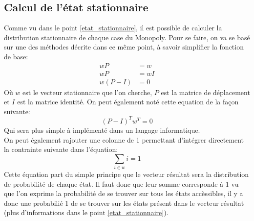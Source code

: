 \documentclass[letterpaper]{article}
\begin{document}
  \subsection{Calcul de l'état stationnaire}
    Comme vu dans le point \ref{etat_stationnaire}, il est possible de calculer
    la distribution stationnaire de chaque case du Monopoly.  Pour se faire, on va
    se basé sur une des méthodes décrite dans ce même point, à savoir simplifier la
    fonction de base:
    \begin{align*}
     wP &= w\\
     wP &= wI\\
     w(P-I) &= 0
    \end{align*}
    Où $w$ est le vecteur stationnaire que l'on cherche, $P$ est la matrice de 
    déplacement et $I$ est la matrice identité.  On peut également noté cette 
    equation de la façon suivante:
    $$(P-I)^{T} w^{T} = 0$$
    Qui sera plus simple à implémenté dans un langage informatique.\\
    On peut également rajouter une colonne de 1 permettant d'intégrer directement la 
    contrainte suivante dans l'équation:
    $$\sum\limits_{i \in w} i = 1$$
    Cette équation part du simple principe que le vecteur résultat sera la distribution 
    de probabilité de chaque état.  Il faut donc que leur somme corresponde à 1 vu 
    que l'on exprime la probabilité de se trouver sur tous les états accèssibles, il y
    a donc une probabilié 1 de se trouver sur les états présent dans le vecteur résultat 
    (plus d'informations dans le point \ref{etat_stationnaire}).
\end{document}
